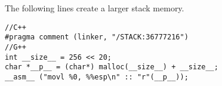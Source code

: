 The following lines create a larger stack memory.

\begin{verbatim}
//C++
#pragma comment (linker, "/STACK:36777216")
//G++
int __size__ = 256 << 20;
char *__p__ = (char*) malloc(__size__) + __size__;
__asm__ ("movl %0, %%esp\n" :: "r"(__p__));
\end{verbatim}

